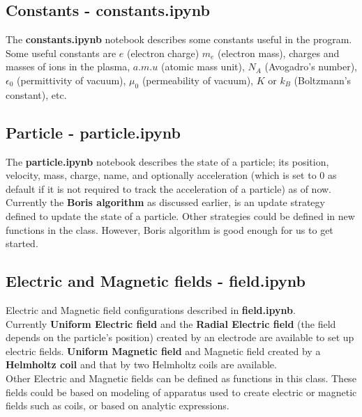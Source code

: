 \documentclass[12pt]{article}
\begin{document}
	\subsection{Constants - constants.ipynb}
	The \textbf{constants.ipynb} notebook describes some constants useful in the program. Some useful constants are $e$ (electron charge) $m_{e}$ (electron mass), charges and masses of ions in the plasma, $a.m.u$ (atomic mass unit), $N_{A}$ (Avogadro's number), $\epsilon_{0}$ (permittivity of vacuum), $\mu_{0}$ (permeability of vacuum), $K$ or $k_{B}$ (Boltzmann's constant), etc.
	
	
	
	\subsection{Particle - particle.ipynb}
	The \textbf{particle.ipynb} notebook describes the state of a particle; its position, velocity, mass, charge, name, and optionally acceleration (which is set to 0 as default if it is not required to track the acceleration of a particle) as of now. \\
	
	\noindent Currently the \textbf{Boris algorithm} as discussed earlier, is an update strategy defined to update the state of a particle. Other strategies could be defined in new functions in the class. However, Boris algorithm is good enough for us to get started.
	
	
	
	\subsection{Electric and Magnetic fields - field.ipynb}
	Electric and Magnetic field configurations described in \textbf{field.ipynb}. \\
	
	\noindent Currently \textbf{Uniform Electric field} and the \textbf{Radial Electric field} (the field depends on the particle's position) created by an electrode are available to set up electric fields. \textbf{Uniform Magnetic field} and Magnetic field created by a \textbf{Helmholtz coil} and that by two Helmholtz coils are available. \\
	
	\noindent Other Electric and Magnetic fields can be defined as functions in this class. These fields could be based on modeling of apparatus used to create electric or magnetic fields such as coils, or based on analytic expressions.
	
\end{document}
